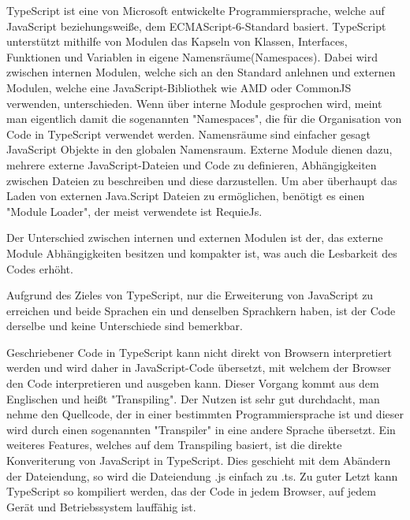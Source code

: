 \label{sec:TypeScript}

TypeScript ist eine von Microsoft entwickelte Programmiersprache, welche auf JavaScript beziehungsweiße, dem ECMAScript-6-Standard basiert. TypeScript unterstützt mithilfe von Modulen das Kapseln von Klassen, Interfaces, Funktionen und Variablen in eigene Namensräume(Namespaces). Dabei wird zwischen internen Modulen, welche sich an den Standard anlehnen und externen Modulen, welche eine JavaScript-Bibliothek wie AMD oder CommonJS verwenden, unterschieden. Wenn über interne Module gesprochen wird, meint man eigentlich damit die sogenannten "Namespaces", die für die Organisation von Code in TypeScript verwendet werden. Namensräume sind einfacher gesagt JavaScript Objekte in den globalen Namensraum. Externe Module dienen dazu, mehrere externe JavaScript-Dateien und Code zu definieren, Abhängigkeiten zwischen Dateien zu beschreiben und diese darzustellen. Um aber überhaupt das Laden von externen Java.Script Dateien zu ermöglichen, benötigt es einen "Module Loader", der meist verwendete ist RequieJs.

Der Unterschied zwischen internen und externen Modulen ist der, das externe Module Abhängigkeiten besitzen und kompakter ist, was auch die Lesbarkeit des Codes erhöht.

\cite{TypeScript}\cite{IntModules}\cite{ExtModules}



Aufgrund des Zieles von TypeScript, nur die Erweiterung von JavaScript zu erreichen und beide Sprachen ein und denselben Sprachkern haben, ist der Code derselbe und keine Unterschiede sind bemerkbar. 
\cite{TypeScript}


Geschriebener Code in TypeScript kann nicht direkt von Browsern interpretiert werden und wird daher in JavaScript-Code übersetzt, mit welchem der Browser den Code interpretieren und ausgeben kann. Dieser Vorgang kommt aus dem Englischen und heißt "Transpiling". Der Nutzen ist sehr gut durchdacht, man nehme den Quellcode, der in einer bestimmten Programmiersprache ist und dieser wird durch einen sogenannten "Transpiler" in eine andere Sprache übersetzt. Ein weiteres Features, welches auf dem Transpiling basiert, ist die direkte Konveriterung von JavaScript in TypeScript. Dies geschieht mit dem Abändern der Dateiendung, so wird die Dateiendung .js einfach zu .ts. Zu guter Letzt kann TypeScript so kompiliert werden, das der Code in jedem Browser, auf jedem Gerät und Betriebssystem lauffähig ist. \cite{Differnces}


